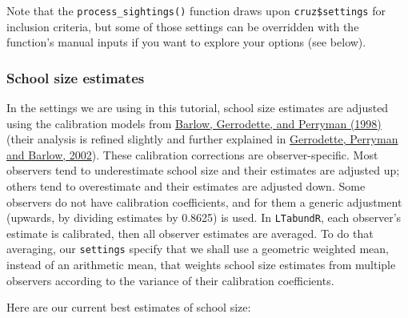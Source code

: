 \documentclass[
]{book}
\newenvironment{Shaded}{\begin{snugshade}}{\end{snugshade}}
\newcommand{\DecValTok}[1]{\textcolor[rgb]{0.00,0.00,0.81}{#1}}
\newcommand{\FloatTok}[1]{\textcolor[rgb]{0.00,0.00,0.81}{#1}}
\newcommand{\KeywordTok}[1]{\textcolor[rgb]{0.13,0.29,0.53}{\textbf{#1}}}
\newcommand{\NormalTok}[1]{#1}
\newcommand{\OperatorTok}[1]{\textcolor[rgb]{0.81,0.36,0.00}{\textbf{#1}}}
\newcommand{\StringTok}[1]{\textcolor[rgb]{0.31,0.60,0.02}{#1}}
\begin{document}
Note that the \texttt{process\_sightings()} function draws upon \texttt{cruz\$settings} for inclusion criteria, but some of those settings can be overridden with the function's manual inputs if you want to explore your options (see below).

\hypertarget{ss_calibration}{%
\subsubsection*{School size estimates}\label{ss_calibration}}

In the settings we are using in this tutorial, school size estimates are adjusted using the calibration models from \href{https://scholar.google.com/scholar?hl=en\&as_sdt=0\%2C43\&q=barlow+1998+group+size+caliration\&btnG=}{Barlow, Gerrodette, and Perryman (1998)} (their analysis is refined slightly and further explained in \href{https://scholar.google.com/scholar?hl=en\&as_sdt=0\%2C43\&q=barlow+1998+group+size+caliration\&btnG=}{Gerrodette, Perryman and Barlow, 2002}). These calibration corrections are observer-specific. Most observers tend to underestimate school size and their estimates are adjusted up; others tend to overestimate and their estimates are adjusted down. Some observers do not have calibration coefficients, and for them a generic adjustment (upwards, by dividing estimates by 0.8625) is used. In \texttt{LTabundR}, each observer's estimate is calibrated, then all observer estimates are averaged. To do that averaging, our \texttt{settings} specify that we shall use a geometric weighted mean, instead of an arithmetic mean, that weights school size estimates from multiple observers according to the variance of their calibration coefficients.

Here are our current best estimates of school size:

\begin{Shaded}
\end{Shaded}
\end{document}
